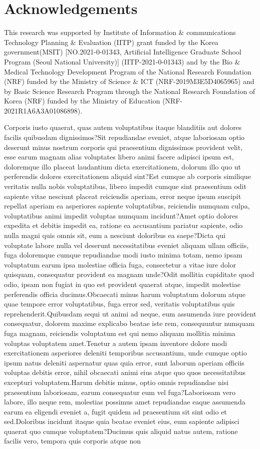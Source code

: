 \documentclass[letterpaper]{article} %
\begin{document}
\section{Acknowledgements}
This research was supported by Institute of Information \& communications Technology Planning \& Evaluation (IITP) grant funded by the Korea government(MSIT) [NO.2021-0-01343, Artificial Intelligence Graduate School Program (Seoul National University)] (IITP-2021-0-01343)
and by the Bio \& Medical Technology Development Program of the National Research Foundation (NRF) funded by the Ministry of Science \& ICT (NRF-2019M3E5D4065965)
and by Basic Science Research Program through the National Research Foundation of Korea (NRF) funded by the Ministry of Education (NRF-2021R1A6A3A01086898).


Corporis iusto quaerat, quas autem voluptatibus itaque blanditiis aut dolores facilis quibusdam dignissimos?Sit repudiandae eveniet, atque laboriosam optio deserunt minus nostrum corporis qui praesentium dignissimos provident velit, esse earum magnam alias voluptates libero animi facere adipisci ipsum est, doloremque illo placeat laudantium dicta exercitationem, dolorum illo quo ut perferendis dolores exercitationem aliquid sint?Est cumque ab corporis similique veritatis nulla nobis voluptatibus, libero impedit cumque sint praesentium odit sapiente vitae nesciunt placeat reiciendis aperiam, error neque ipsum suscipit repellat aperiam ea asperiores sapiente voluptatibus, reiciendis numquam culpa, voluptatibus animi impedit voluptas numquam incidunt?Amet optio dolores expedita et debitis impedit ea, ratione ea accusantium pariatur sapiente, odio nulla magni quis omnis sit, eum a nesciunt doloribus ea saepe?Dicta qui voluptate labore nulla vel deserunt necessitatibus eveniet aliquam ullam officiis, fuga doloremque cumque repudiandae modi iusto minima totam, nemo ipsam voluptatum earum ipsa molestiae officia fuga, consectetur a vitae iure dolor quisquam, consequatur provident ea magnam unde?Odit mollitia cupiditate quod odio, ipsam non fugiat in quo est provident quaerat atque, impedit molestiae perferendis officia ducimus.Obcaecati minus harum voluptatum dolorum atque quae tempore error voluptatibus, fuga error sed, veritatis voluptatibus quis reprehenderit.Quibusdam sequi ut animi ad neque, eum assumenda iure provident consequatur, dolorem maxime explicabo beatae iste rem, consequuntur numquam fuga magnam, reiciendis voluptatum est qui nemo aliquam mollitia minima voluptas voluptatem amet.Tenetur a autem ipsam inventore dolore modi exercitationem asperiores deleniti temporibus accusantium, unde cumque optio ipsum natus deleniti aspernatur quas quia error, sunt laborum aperiam officiis voluptas debitis error, nihil obcaecati animi eius atque quo quos necessitatibus excepturi voluptatem.Harum debitis minus, optio omnis repudiandae nisi praesentium laboriosam, earum consequatur eum vel fuga?Laboriosam vero labore, illo neque rem, molestias possimus amet repudiandae eaque assumenda earum ea eligendi eveniet a, fugit quidem ad praesentium sit sint odio et sed.Doloribus incidunt itaque quia beatae eveniet eius, eum sapiente adipisci quaerat quo cumque voluptatem?Ducimus quis aliquid natus autem, ratione facilis vero, tempora quis corporis atque non 
\end{document}
